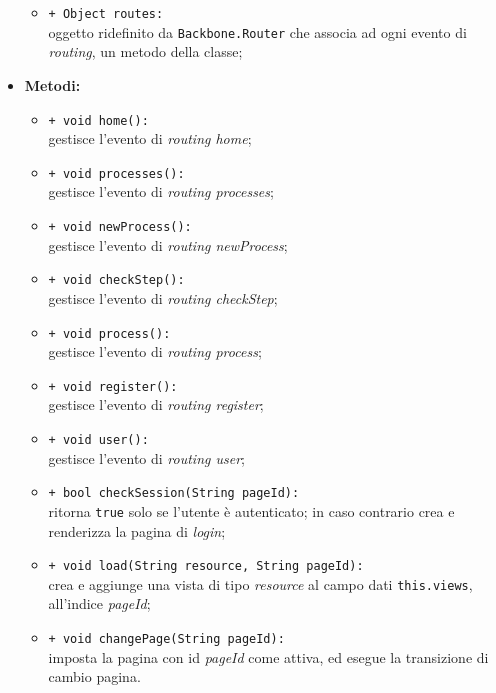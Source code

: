 \begin{flushleft}
\begin{itemize}
\begin{sloppypar}
\begin{itemize}
\item \texttt{+ Object routes:}\\ oggetto ridefinito da \texttt{Backbone.Router} che associa ad ogni evento di \textit{routing}, un metodo della classe;
\end{itemize}
\end{sloppypar}
\item \textbf{Metodi:}
\begin{sloppypar}
\begin{itemize}
\item \texttt{+ void home():}\\ gestisce l'evento di \textit{routing home};
\item \texttt{+ void processes():}\\ gestisce l'evento di \textit{routing processes};
\item \texttt{+ void newProcess():}\\ gestisce l'evento di \textit{routing newProcess};
\item \texttt{+ void checkStep():}\\ gestisce l'evento di \textit{routing checkStep};
\item \texttt{+ void process():}\\ gestisce l'evento di \textit{routing process};
\item \texttt{+ void register():}\\ gestisce l'evento di \textit{routing register};
\item \texttt{+ void user():}\\ gestisce l'evento di \textit{routing user};
\item \texttt{+ bool checkSession(String pageId):}\\ ritorna \texttt{true} solo se l'utente è autenticato; in caso contrario crea e renderizza la pagina di \textit{login};
\item \texttt{+ void load(String resource, String pageId):}\\ crea e aggiunge una vista di tipo \textit{resource} al campo dati \texttt{this.views}, all'indice \textit{pageId};
\item \texttt{+ void changePage(String pageId):}\\ imposta la pagina con id \textit{pageId} come attiva, ed esegue la transizione di cambio pagina.
\end{itemize}
\end{sloppypar}
\end{itemize}
\end{flushleft}

